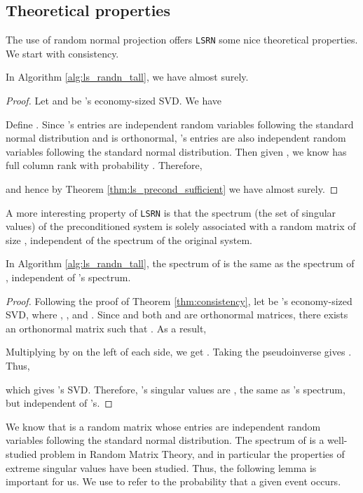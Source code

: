 \documentclass{siamltex}
\begin{document}
\subsection{Theoretical properties}
\label{subsec:theoretical_properties}

The use of random normal projection offers \texttt{LSRN} some nice theoretical
properties. We start with consistency.

\begin{theorem}
  \label{thm:consistency}
  In Algorithm \ref{alg:ls_randn_tall}, we have  almost
  surely.
\end{theorem}

\begin{proof}
  Let  and  be 's economy-sized SVD. We have
  
  Define . Since 's entries are
  independent random variables following the standard normal distribution and
   is orthonormal, 's entries are also independent random variables
  following the standard normal distribution. Then given , we know  has full column rank  with probability
  . Therefore,
  
  and hence by Theorem \ref{thm:ls_precond_sufficient} we have  almost surely.
\end{proof}

A more interesting property of \texttt{LSRN} is that the spectrum (the set of
singular values) of the preconditioned system is solely associated with a random
matrix of size , independent of the spectrum of the original system.

\begin{lemma}
  \label{lemma:spectrum}
  In Algorithm \ref{alg:ls_randn_tall}, the spectrum of  is the same as the
  spectrum of , independent of 's spectrum.
\end{lemma}

\begin{proof}
  Following the proof of Theorem \ref{thm:consistency}, let  be 's economy-sized SVD, where ,
  , and . Since  and both  and  are orthonormal matrices,
  there exists an orthonormal matrix  such that
  .  As a result,
  
  Multiplying by  on the left of each side, we get . Taking the pseudoinverse gives
  .
  Thus,
  
  which gives 's SVD. Therefore, 's singular values are
  , the same as 's spectrum, but
  independent of 's.
\end{proof}

We know that  is a random matrix whose entries are independent random
variables following the standard normal distribution.  The spectrum of  is
a well-studied problem in Random Matrix Theory, and in particular the properties
of extreme singular values have been studied.  Thus, the following lemma is
important for us. We use  to refer to the probability that a
given event occurs.
\end{document}
